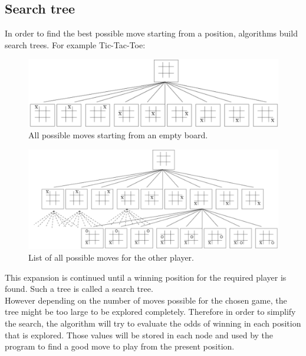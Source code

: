 
\subsection{Search tree}
\label{trees}
In order to find the best possible move starting from a position, algorithms build search trees. 
For example Tic-Tac-Toe: \cite{images_annexes}
\begin{figure}[H]
	\centering
	\includegraphics[width=15cm]{5_Annexes/img/Tree1.png}
	\caption{\label{fig:tree1}All possible moves starting from an empty board.}
\end{figure}
\noindent
\begin{figure}[H]
	\centering
	\includegraphics[width=15cm]{5_Annexes/img/Tree2.png}
	\caption{\label{fig:tree2}List of all possible moves for the other player.}
\end{figure}
\noindent

This expansion is continued until a winning position for the required player is found. Such a tree is called a search tree.
\bigskip\\

However depending on the number of moves possible for the chosen game, the tree might be too large to be explored completely. Therefore in order to simplify the search, the algorithm will try to evaluate the odds of winning in each position that is explored. Those values will be stored in each node and used by the program to find a good move to play from the present position.